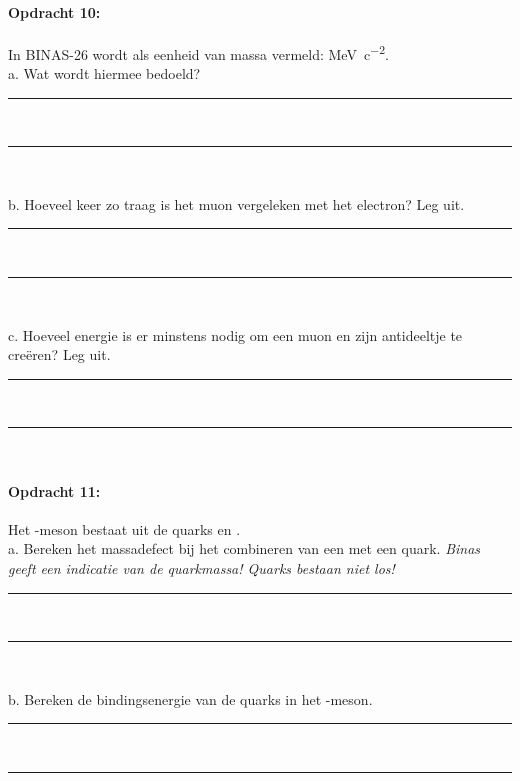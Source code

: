 \paragraph{Opdracht 10:}
In BINAS-26 wordt als eenheid van massa vermeld: \si{MeV.c^{-2}}.\\
a. Wat wordt hiermee bedoeld?
\begin{center}
    \rule{\textwidth}{0.3mm}\\
    \rule{\textwidth}{0.3mm}\\
\end{center}
b. Hoeveel keer zo traag is het muon vergeleken met het electron? Leg uit.
\begin{center}
    \rule{\textwidth}{0.3mm}\\
    \rule{\textwidth}{0.3mm}\\
\end{center}
c. Hoeveel energie is er minstens nodig om een muon en zijn antideeltje te 
creëren? Leg uit.
\begin{center}
    \rule{\textwidth}{0.3mm}\\
    \rule{\textwidth}{0.3mm}\\
\end{center}

\paragraph{Opdracht 11:}
Het \Ppiplus-meson bestaat uit de quarks \Pup en \APdown.\\
a. Bereken het massadefect bij het combineren van een \Pup met een \APdown quark.
\emph{Binas geeft een indicatie van de quarkmassa! Quarks bestaan niet los!}
\begin{center}
    \rule{\textwidth}{0.3mm}\\
    \rule{\textwidth}{0.3mm}\\
\end{center}
b. Bereken de bindingsenergie van de quarks in het \Ppiplus-meson.
\begin{center}
    \rule{\textwidth}{0.3mm}\\
    \rule{\textwidth}{0.3mm}\\
\end{center}


